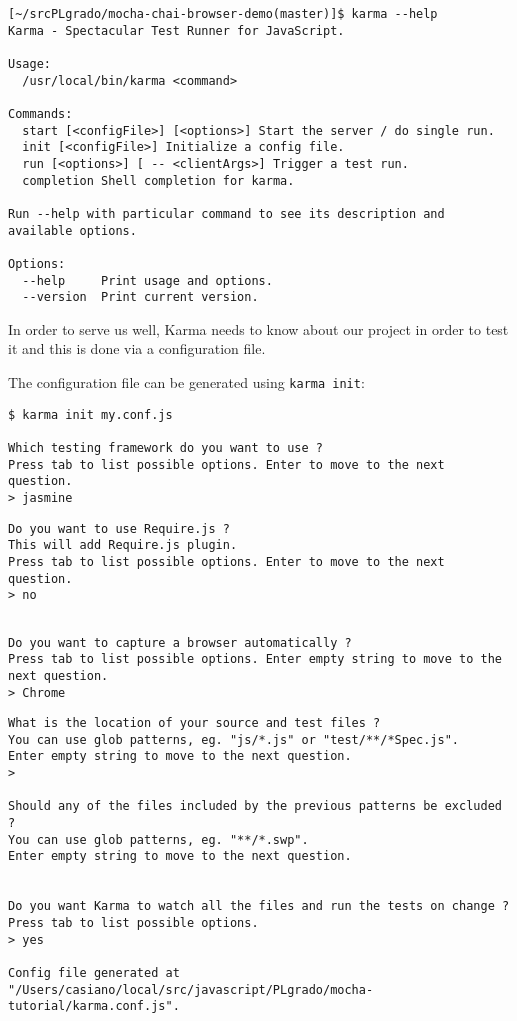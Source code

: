 \begin{verbatim}
[~/srcPLgrado/mocha-chai-browser-demo(master)]$ karma --help
Karma - Spectacular Test Runner for JavaScript.

Usage:
  /usr/local/bin/karma <command>

Commands:
  start [<configFile>] [<options>] Start the server / do single run.
  init [<configFile>] Initialize a config file.
  run [<options>] [ -- <clientArgs>] Trigger a test run.
  completion Shell completion for karma.

Run --help with particular command to see its description and available options.

Options:
  --help     Print usage and options.
  --version  Print current version.  
\end{verbatim}

In order to serve us well, Karma needs to know about our project in
order to test it and this is done via a configuration file. 

The configuration file can be generated using \verb|karma init|:
\begin{verbatim}
$ karma init my.conf.js

Which testing framework do you want to use ?
Press tab to list possible options. Enter to move to the next question.
> jasmine
\end{verbatim}

\begin{verbatim}
Do you want to use Require.js ?
This will add Require.js plugin.
Press tab to list possible options. Enter to move to the next question.
> no
\end{verbatim}



\begin{verbatim}

Do you want to capture a browser automatically ?
Press tab to list possible options. Enter empty string to move to the next question.
> Chrome
\end{verbatim}


\begin{verbatim}
What is the location of your source and test files ?
You can use glob patterns, eg. "js/*.js" or "test/**/*Spec.js".
Enter empty string to move to the next question.
> 

Should any of the files included by the previous patterns be excluded ?
You can use glob patterns, eg. "**/*.swp".
Enter empty string to move to the next question.


Do you want Karma to watch all the files and run the tests on change ?
Press tab to list possible options.
> yes

Config file generated at "/Users/casiano/local/src/javascript/PLgrado/mocha-tutorial/karma.conf.js".
\end{verbatim}

